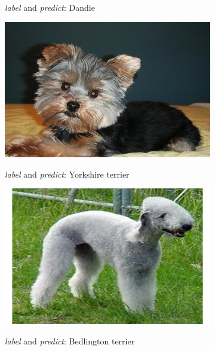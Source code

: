 \documentclass{article}
\begin{document}
\begin{figure}[h]
\begin{subfigure}{0.32\linewidth}
		\caption{}
		\emph{label} and \emph{predict}: Dandie
		\label{fig:success_dandie}
	\end{subfigure} 
	
	\begin{subfigure}{0.32\linewidth}
		\centering
		\includegraphics[width=\linewidth]{pics/success_york}
		\caption{}
		\emph{label} and \emph{predict}: Yorkshire terrier
		\label{fig:success_york}
	\end{subfigure} 
	\begin{subfigure}{0.32\linewidth}
		\centering
		\includegraphics[width=\linewidth]{pics/success_bed}
		\caption{}
		\emph{label} and \emph{predict}: Bedlington terrier
		\label{fig:success_bed}
	\end{subfigure} 
	\begin{subfigure}{0.32\linewidth}
		\centering

\end{subfigure}
\end{figure}
\end{document}
